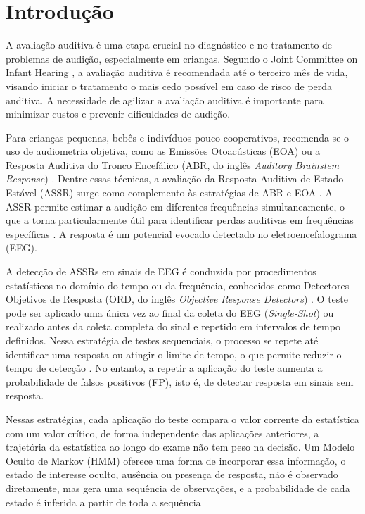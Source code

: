 \documentclass[conference]{IEEEtran}
\begin{document}
\section{Introdução}

A avaliação auditiva é uma etapa crucial no diagnóstico e no tratamento de problemas de audição, especialmente em crianças. Segundo o Joint Committee on Infant Hearing \cite{jcih2007}, a avaliação auditiva é recomendada até o terceiro mês de vida, visando iniciar o tratamento o mais cedo possível em caso de risco de perda auditiva. A necessidade de agilizar a avaliação auditiva é importante para minimizar custos e prevenir dificuldades de audição.

Para crianças pequenas, bebês e indivíduos pouco cooperativos, recomenda-se o uso de audiometria objetiva, como as Emissões Otoacústicas (EOA) ou a Resposta Auditiva do Tronco Encefálico (ABR, do inglês \textit{Auditory Brainstem Response}) \cite{picton2003}. Dentre essas técnicas, a avaliação da Resposta Auditiva de Estado Estável (ASSR) surge como complemento às estratégias de ABR e EOA \cite{sturzebecher1999}. A ASSR permite estimar a audição em diferentes frequências simultaneamente, o que a torna particularmente útil para identificar perdas auditivas em frequências específicas \cite{sininger2018}. A resposta é um potencial evocado detectado no eletroencefalograma (EEG).

A detecção de ASSRs em sinais de EEG é conduzida por procedimentos estatísticos no domínio do tempo ou da frequência, conhecidos como Detectores Objetivos de Resposta (ORD, do inglês \textit{Objective Response Detectors}) \cite{sturzebecher1999}. O teste pode ser aplicado uma única vez ao final da coleta do EEG (\textit{Single-Shot}) ou realizado antes da coleta completa do sinal e repetido em intervalos de tempo definidos. Nessa estratégia de testes sequenciais, o processo se repete até identificar uma resposta ou atingir o limite de tempo, o que permite reduzir o tempo de detecção \cite{zanotelli2020,vaz2024,cebulla2015}. No entanto, a repetir a aplicação do teste aumenta a probabilidade de falsos positivos (FP), isto é, de detectar resposta em sinais sem resposta.

Nessas estratégias, cada aplicação do teste compara o valor corrente da estatística com um valor crítico, de forma independente das aplicações anteriores, a trajetória da estatística ao longo do exame não tem peso na decisão. Um Modelo Oculto de Markov (HMM) oferece uma forma de incorporar essa informação, o estado de interesse oculto, ausência ou presença de resposta, não é observado diretamente, mas gera uma sequência de observações, e a probabilidade de cada estado é inferida a partir de toda a sequência \cite{rabiner1989}
\end{document}
